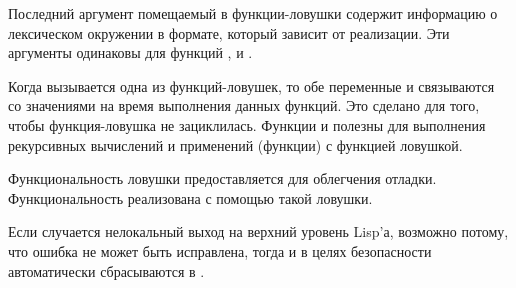\begin{defun}[Переменная]
Последний аргумент помещаемый в функции-ловушки содержит информацию о
лексическом окружении в формате, который зависит от реализации.
Эти аргументы одинаковы для функций ,  и
.

Когда вызывается одна из функций-ловушек, то обе переменные  и
 связываются со значениями {\nil} на время выполнения данных
функций. Это сделано для того, чтобы функция-ловушка не зациклилась.
Функции  и  полезны для выполнения рекурсивных
вычислений и применений (функции) с функцией ловушкой.

Функциональность ловушки предоставляется для облегчения отладки.
Функциональность  реализована с помощью такой ловушки.

Если случается нелокальный выход на верхний уровень Lisp'а, возможно потому, что
ошибка не может быть исправлена, тогда  и 
в целях безопасности автоматически сбрасываются в {\false}.
\end{defun}

